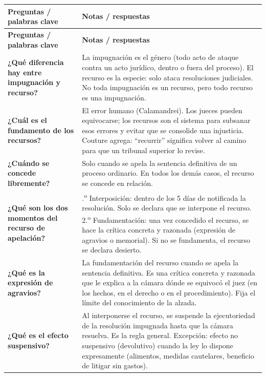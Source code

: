 \documentclass[12pt,oneside]{book}
\begin{document}
\begin{longtable}{
    >{\raggedright\arraybackslash}p{}
    >{\raggedright\arraybackslash}p{}
}
\toprule
\textbf{Preguntas / palabras clave} & \textbf{Notas / respuestas} \\
\midrule
\endfirsthead
\toprule
\textbf{Preguntas / palabras clave} & \textbf{Notas / respuestas} \\
\midrule
\endhead
\bottomrule
\endfoot

\textbf{¿Qué diferencia hay entre impugnación y recurso?} &
La impugnación es el género (todo acto de ataque contra un acto jurídico, dentro o fuera del proceso). El recurso es la especie: solo ataca resoluciones judiciales. No toda impugnación es un recurso, pero todo recurso es una impugnación. \\

\textbf{¿Cuál es el fundamento de los recursos?} &
El error humano (Calamandrei). Los jueces pueden equivocarse; los recursos son el sistema para subsanar esos errores y evitar que se consolide una injusticia. Couture agrega: ``recurrir'' significa volver al camino para que un tribunal superior lo revise. \\

\textbf{¿Cuándo se concede libremente?} &
Solo cuando se apela la sentencia definitiva de un proceso ordinario. En todos los demás casos, el recurso se concede en relación. \\

\textbf{¿Qué son los dos momentos del recurso de apelación?} &
1.\textsuperscript{o} Interposición: dentro de los 5 días de notificada la resolución. Solo se declara que se interpone el recurso. 2.\textsuperscript{o} Fundamentación: una vez concedido el recurso, se hace la crítica concreta y razonada (expresión de agravios o memorial). Si no se fundamenta, el recurso se declara desierto. \\

\textbf{¿Qué es la expresión de agravios?} &
La fundamentación del recurso cuando se apela la sentencia definitiva. Es una crítica concreta y razonada que le explica a la cámara dónde se equivocó el juez (en los hechos, en el derecho o en el procedimiento). Fija el límite del conocimiento de la alzada. \\

\textbf{¿Qué es el efecto suspensivo?} &
Al interponerse el recurso, se suspende la ejecutoriedad de la resolución impugnada hasta que la cámara resuelva. Es la regla general. Excepción: efecto no suspensivo (devolutivo) cuando la ley lo dispone expresamente (alimentos, medidas cautelares, beneficio de litigar sin gastos). \\


\end{longtable}
\end{document}
